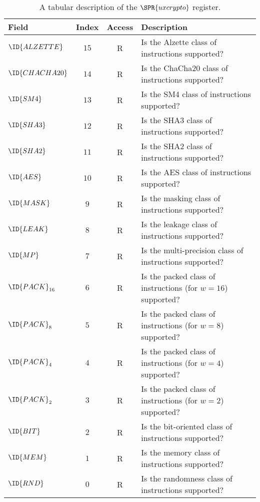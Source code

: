 \begin{table}[p]
\begin{center}
\begin{tabular}{|l|c|c|l|}
\hline
Field            & Index           & Access & Description                                                            \\ 
\hline
$\ID{ALZETTE}  $ & $           15$ & R      & Is the Alzette         class of instructions                supported? \\
$\ID{CHACHA20} $ & $           14$ & R      & Is the ChaCha20        class of instructions                supported? \\
$\ID{SM4}      $ & $           13$ & R      & Is the SM4             class of instructions                supported? \\
$\ID{SHA3}     $ & $           12$ & R      & Is the SHA3            class of instructions                supported? \\
$\ID{SHA2}     $ & $           11$ & R      & Is the SHA2            class of instructions                supported? \\
$\ID{AES }     $ & $           10$ & R      & Is the AES             class of instructions                supported? \\
$\ID{MASK}     $ & $            9$ & R      & Is the masking         class of instructions                supported? \\
$\ID{LEAK}     $ & $            8$ & R      & Is the leakage         class of instructions                supported? \\
$\ID{MP  }     $ & $            7$ & R      & Is the multi-precision class of instructions                supported? \\
$\ID{PACK}_{16}$ & $            6$ & R      & Is the packed          class of instructions (for $w = 16$) supported? \\
$\ID{PACK}_{8} $ & $            5$ & R      & Is the packed          class of instructions (for $w =  8$) supported? \\
$\ID{PACK}_{4} $ & $            4$ & R      & Is the packed          class of instructions (for $w =  4$) supported? \\
$\ID{PACK}_{2} $ & $            3$ & R      & Is the packed          class of instructions (for $w =  2$) supported? \\
$\ID{BIT }     $ & $            2$ & R      & Is the bit-oriented    class of instructions                supported? \\
$\ID{MEM }     $ & $            1$ & R      & Is the memory          class of instructions                supported? \\
$\ID{RND }     $ & $            0$ & R      & Is the randomness      class of instructions                supported? \\
\hline
\end{tabular}
\end{center}
\caption{A tabular      description of the $\SPR{uxcrypto}$ register.}
\label{tab:csr:uxcrypto}
\end{table}

